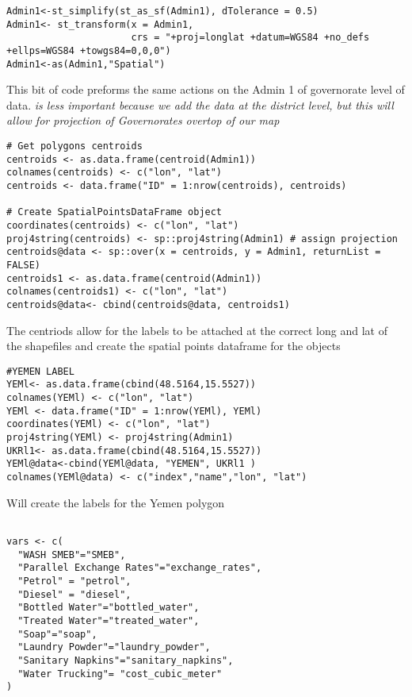 \documentclass[
]{article}
\begin{document}
\begin{verbatim}
Admin1<-st_simplify(st_as_sf(Admin1), dTolerance = 0.5)
Admin1<- st_transform(x = Admin1, 
                      crs = "+proj=longlat +datum=WGS84 +no_defs +ellps=WGS84 +towgs84=0,0,0")
Admin1<-as(Admin1,"Spatial")
\end{verbatim}

This bit of code preforms the same actions on the Admin 1 of governorate
level of data. \emph{is less important because we add the data at the
district level, but this will allow for projection of Governorates
overtop of our map}

\begin{verbatim}
# Get polygons centroids
centroids <- as.data.frame(centroid(Admin1))
colnames(centroids) <- c("lon", "lat")
centroids <- data.frame("ID" = 1:nrow(centroids), centroids)

# Create SpatialPointsDataFrame object
coordinates(centroids) <- c("lon", "lat") 
proj4string(centroids) <- sp::proj4string(Admin1) # assign projection
centroids@data <- sp::over(x = centroids, y = Admin1, returnList = FALSE)
centroids1 <- as.data.frame(centroid(Admin1))
colnames(centroids1) <- c("lon", "lat")
centroids@data<- cbind(centroids@data, centroids1)
\end{verbatim}

The centriods allow for the labels to be attached at the correct long
and lat of the shapefiles and create the spatial points dataframe for
the objects

\begin{verbatim}
#YEMEN LABEL
YEMl<- as.data.frame(cbind(48.5164,15.5527))
colnames(YEMl) <- c("lon", "lat")
YEMl <- data.frame("ID" = 1:nrow(YEMl), YEMl)
coordinates(YEMl) <- c("lon", "lat") 
proj4string(YEMl) <- proj4string(Admin1)
UKRl1<- as.data.frame(cbind(48.5164,15.5527))
YEMl@data<-cbind(YEMl@data, "YEMEN", UKRl1 )
colnames(YEMl@data) <- c("index","name","lon", "lat")
\end{verbatim}

Will create the labels for the Yemen polygon

\begin{verbatim}

vars <- c(
  "WASH SMEB"="SMEB",
  "Parallel Exchange Rates"="exchange_rates",
  "Petrol" = "petrol",
  "Diesel" = "diesel",
  "Bottled Water"="bottled_water",
  "Treated Water"="treated_water",
  "Soap"="soap",
  "Laundry Powder"="laundry_powder",
  "Sanitary Napkins"="sanitary_napkins",
  "Water Trucking"= "cost_cubic_meter"
)
\end{verbatim}
\end{document}
